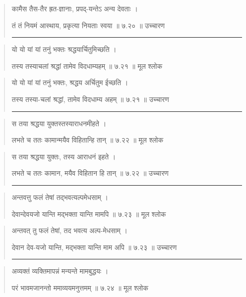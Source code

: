 \begin{quotation}
कामैस तैस-तैर ह्रत-ज्ञानाः, प्रपद्-यन्तेऽ अन्य देवताः  ।  

तं तं नियमं आस्थाय, प्रकृत्या नियताः स्वया  ॥ ७.२० ॥  उच्चारण

\noindent\rule{16cm}{0.4pt} 
\end{quotation}


\begin{quotation} 
यो यो यां यां तनुं भक्तः श्रद्धयार्चितुमिच्छति  ।  

तस्य तस्याचलां श्रद्धां तामेव विदधाम्यहम्‌  ॥ ७.२१ ॥  मूल श्लोक
\end{quotation}

\begin{quotation}
यो यो यां यां तनुं भक्तः, श्रद्धय अर्चितुम ईच्छति  ।  

तस्य तस्या-चलां श्रद्धां, तामेव विदधाम्य अहम्‌  ॥ ७.२१ ॥  उच्चारण

\noindent\rule{16cm}{0.4pt} 
\end{quotation}


\begin{quotation} 
स तया श्रद्धया युक्तस्तस्याराधनमीहते  ।  

लभते च ततः कामान्मयैव विहितान्हि तान्‌  ॥ ७.२२ ॥  मूल श्लोक
\end{quotation}

\begin{quotation}
स तया श्रद्धया युक्तः, तस्य आराधनं इहते  ।  

लभते च ततः कामान, मयैव विहितान हि तान्‌  ॥ ७.२२ ॥  उच्चारण

\noindent\rule{16cm}{0.4pt} 
\end{quotation}


\begin{quotation} 
अन्तवत्तु फलं तेषां तद्भवत्यल्पमेधसाम्‌  ।  

देवान्देवयजो यान्ति मद्भक्ता यान्ति मामपि  ॥ ७.२३ ॥  मूल श्लोक
\end{quotation}

\begin{quotation}
अन्तवत् तु फलं तेषां, तद भवत्य अल्प-मेधसाम्‌  ।  

देवान देव-यजो यान्ति, मद्भक्ता यान्ति माम अपि  ॥ ७.२३ ॥  उच्चारण

\noindent\rule{16cm}{0.4pt} 
\end{quotation}


\begin{quotation} 
अव्यक्तं व्यक्तिमापन्नं मन्यन्ते मामबुद्धयः  ।  

परं भावमजानन्तो ममाव्ययमनुत्तमम्‌  ॥ ७.२४ ॥  मूल श्लोक
\end{quotation}

